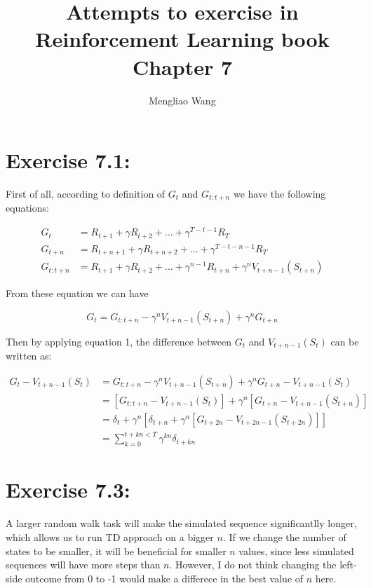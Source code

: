 \documentclass[10pt,letterpaper]{article}
\title{Attempts to exercise in Reinforcement Learning book Chapter 7}
\author{Mengliao Wang}
\begin{document}
\maketitle



\section*{Exercise 7.1: }
\label{7.1}

First of all, according to definition of $G_t$ and $G_{t:t+n}$ we have the following equations:

\begin{align*}
G_t &= R_{t+1} + \gamma R_{t+2} + ... + \gamma^{T-t-1}R_T\\
G_{t+n} &= R_{t+n+1} + \gamma R_{t+n+2} + ... + \gamma^{T-t-n-1}R_T\\
G_{t:t+n} &= R_{t+1} + \gamma R_{t+2} + ... + \gamma^{n-1}R_{t+n} + \gamma^nV_{t+n-1}(S_{t+n})
\end{align*}

From these equation we can have 

\begin{equation}
G_t = G_{t:t+n} -\gamma^nV_{t+n-1}(S_{t+n}) + \gamma^nG_{t+n}
\end{equation}

Then by applying equation 1, the difference between $G_t$ and $V_{t+n-1}(S_t)$ can be written as:

\begin{align}
G_t - V_{t+n-1}(S_t) &= G_{t:t+n} -\gamma^nV_{t+n-1}(S_{t+n}) + \gamma^nG_{t+n} - V_{t+n-1}(S_t) \\
&= [G_{t:t+n} - V_{t+n-1}(S_t)] + \gamma^n[G_{t+n} - V_{t+n-1}(S_{t+n})]\\
&= \delta_t + \gamma^n[\delta_{t+n} + \gamma^n[G_{t+2n} - V_{t+2n-1}(S_{t+2n})]]\\
&= \sum_{k=0}^{t+kn<T}\gamma^{kn}\delta_{t+kn}
\end{align}


\section*{Exercise 7.3: }
\label{7.3}

A larger random walk task will make the simulated sequence significantlly longer, which allows us to run TD approach on a bigger $n$. If we change the number of states to be smaller, it will be beneficial for smaller $n$ values, since less simulated sequences will have more steps than $n$. However, I do not think changing the left-side outcome from 0 to -1 would make a differece in the best value of $n$ here.
\end{document}
